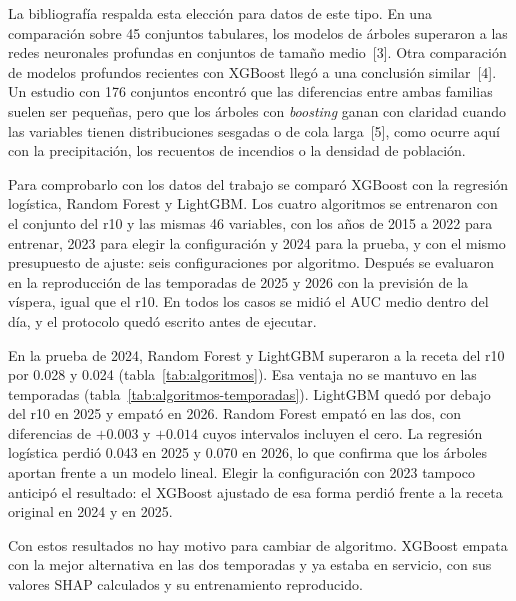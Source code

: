 \documentclass[10pt,a4paper]{article}
\begin{document}
La bibliografía respalda esta elección para datos de este tipo. En una
comparación sobre 45 conjuntos tabulares, los modelos de árboles superaron a
las redes neuronales profundas en conjuntos de tamaño medio~[3]. Otra
comparación de modelos profundos recientes con XGBoost llegó a una conclusión
similar~[4]. Un estudio con 176 conjuntos encontró que las diferencias entre
ambas familias suelen ser pequeñas, pero que los árboles con
\emph{boosting} ganan con claridad cuando las variables tienen distribuciones
sesgadas o de cola larga~[5], como ocurre aquí con la precipitación, los
recuentos de incendios o la densidad de población.

Para comprobarlo con los datos del trabajo se comparó XGBoost con la
regresión logística, Random Forest y LightGBM. Los cuatro algoritmos se
entrenaron con el conjunto del r10 y las mismas 46 variables, con los años de
2015 a 2022 para entrenar, 2023 para elegir la configuración y 2024 para la
prueba, y con el mismo presupuesto de ajuste: seis configuraciones por
algoritmo. Después se evaluaron en la reproducción de las temporadas de 2025 y
2026 con la previsión de la víspera, igual que el r10. En todos los casos se
midió el AUC medio dentro del día, y el protocolo quedó escrito antes de
ejecutar.

En la prueba de 2024, Random Forest y LightGBM superaron a la receta del r10
por 0.028 y 0.024 (tabla~\ref{tab:algoritmos}). Esa ventaja no se mantuvo en
las temporadas (tabla~\ref{tab:algoritmos-temporadas}). LightGBM quedó por
debajo del r10 en 2025 y empató en 2026. Random Forest empató en las dos, con
diferencias de $+0.003$ y $+0.014$ cuyos intervalos incluyen el cero. La
regresión logística perdió 0.043 en 2025 y 0.070 en 2026, lo que confirma que
los árboles aportan frente a un modelo lineal. Elegir la configuración con
2023 tampoco anticipó el resultado: el XGBoost ajustado de esa forma perdió
frente a la receta original en 2024 y en 2025.

Con estos resultados no hay motivo para cambiar de algoritmo. XGBoost empata
con la mejor alternativa en las dos temporadas y ya estaba en servicio, con
sus valores SHAP calculados y su entrenamiento reproducido.



\end{document}
